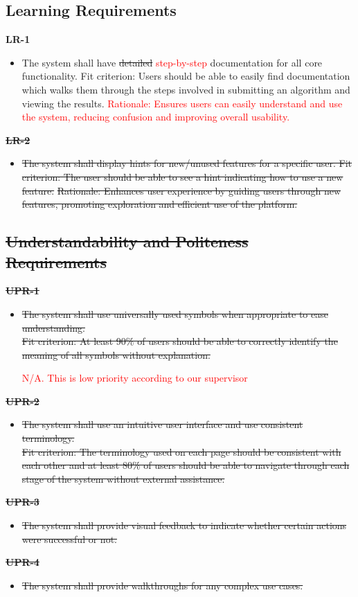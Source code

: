 \documentclass[12pt]{article}
\begin{document}
\subsection{Learning Requirements}
\textbf{LR-1}
\begin{itemize}
    \item The system shall have \sout{detailed} \textcolor{red}{step-by-step} documentation for all core functionality. \hfill \break
    Fit criterion: Users should be able to easily find documentation which walks them through the steps involved in submitting an algorithm and viewing the results.
    \hfill \break
    \textcolor{red} {Rationale: Ensures users can easily understand and use the system, reducing confusion and improving overall usability.}
\end{itemize}
\textbf{\sout{LR-2}}
\begin{itemize}
    \item \sout{The system shall display hints for new/unused features for a specific user. \hfill \break
    Fit criterion: The user should be able to see a hint indicating how to use a new feature.}
    \hfill \break
    \sout{Rationale: Enhances user experience by guiding users through new features, promoting exploration and efficient use of the platform.}
\end{itemize}

\subsection{\sout{Understandability and Politeness Requirements}}
\textbf{\sout{UPR-1}}
\begin{itemize}
    \item \sout{The system shall use universally used symbols when appropriate to ease understanding. \\
    Fit criterion: At least 90\% of users should be able to correctly identify the meaning of all symbols without explanation. }

    \textcolor{red}{N/A. This is low priority according to our supervisor}
\end{itemize}
\textbf{\sout{UPR-2}}
\begin{itemize}
    \item \sout{The system shall use an intuitive user interface and use consistent terminology. \\
    Fit criterion: The terminology used on each page should be consistent with each other and at least 80\% of users should be able to navigate through each stage of the system without external assistance. }
\end{itemize}
\textbf{\sout{UPR-3}}
\begin{itemize}
    \item \sout{The system shall provide visual feedback to indicate whether certain actions were successful or not.}
\end{itemize}
\textbf{\sout{UPR-4}}
\begin{itemize}
    \item \sout{The system shall provide walkthroughs for any complex use cases.}
\end{itemize}
\end{document}
